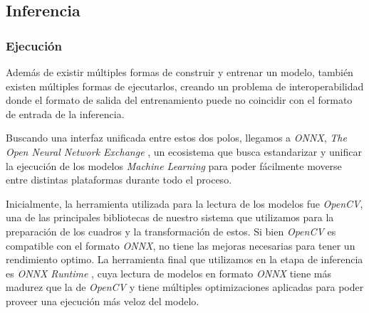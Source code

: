 \documentclass[a4paper]{article}
\begin{document}
\subsection{Inferencia}

\subsubsection{Ejecución}

Además de existir múltiples formas de construir y entrenar un modelo, también existen múltiples formas de ejecutarlos, creando un problema de interoperabilidad donde el formato de salida del entrenamiento puede no coincidir con el formato de entrada de la inferencia.

Buscando una interfaz unificada entre estos dos polos, llegamos a \textit{ONNX}, \textit{The Open Neural Network Exchange} \cite{onnx}, un ecosistema que busca estandarizar y unificar la ejecución de los modelos \textit{Machine Learning} para poder fácilmente moverse entre distintas plataformas durante todo el proceso. \medskip

Inicialmente, la herramienta utilizada para la lectura de los modelos fue \textit{OpenCV}, una de las principales bibliotecas de nuestro sistema que utilizamos para la preparación de los cuadros y la transformación de estos. Si bien \textit{OpenCV} es compatible con el formato \textit{ONNX}, no tiene las mejoras necesarias para tener un rendimiento optimo. La herramienta final que utilizamos en la etapa de inferencia es \textit{ONNX Runtime} \cite{ort}, cuya lectura de modelos en formato \textit{ONNX} tiene más madurez que la de \textit{OpenCV} y tiene múltiples optimizaciones aplicadas para poder proveer una ejecución más veloz del modelo.
\end{document}
